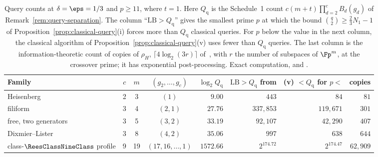 \begin{table}[htbp]
\centering
\caption{Query counts at $\delta = \eps = 1/3$ and $p \ge 11$, where $t = 1$. Here $Q_{\mathrm q}$ is the Schedule~1 count $c(m+t)\prod_{d=2}^c B_d(g_d)$ of Remark~\ref{rem:query-separation}. The column ``$\mathrm{LB} > Q_{\mathrm q}$'' gives the smallest prime $p$ at which the bound $\binom q2 \ge \frac23 N_1 - 1$ of Proposition~\ref{prop:classical-query}(i) forces more than $Q_{\mathrm q}$ classical queries. For $p$ below the value in the next column, the classical algorithm of Proposition~\ref{prop:classical-query}(v) uses fewer than $Q_{\mathrm q}$ queries. The last column is the information-theoretic count of copies of $\rho_H$, $\lceil 4\log_2(3r)\rceil$ of~\cite[Eq.~(10.10)]{ChildsQA}, with $r$ the number of subspaces of $\Fp^m$, at the crossover prime; it has exponential post-processing. Exact computation,  and .}
\label{tab:query-crossover}
\small
\begin{tabular}{@{}lcccrrrr@{}}
\toprule
Family & $c$ & $m$ & $(g_2,\dots,g_c)$ & $\log_2 Q_{\mathrm q}$ & $\mathrm{LB} > Q_{\mathrm q}$ from & (v) $< Q_{\mathrm q}$ for $p <$ & copies \\
\midrule
Heisenberg & 2 & 3 & $(1)$ & $9.00$ & $443$ & $84$ & $81$ \\
filiform & 3 & 4 & $(2,1)$ & $27.76$ & $337{,}853$ & $119{,}671$ & $301$ \\
free, two generators & 3 & 5 & $(3,2)$ & $33.19$ & $92{,}107$ & $42{,}290$ & $407$ \\
Dixmier--Lister & 3 & 8 & $(4,2)$ & $35.06$ & $997$ & $638$ & $644$ \\
class-$\ReesClassNineClass$ profile & 9 & 19 & $(17,16,\dots,1)$ & $1572.66$ & $2^{174.72}$ & $2^{174.47}$ & $62{,}909$ \\
\bottomrule
\end{tabular}
\end{table}

